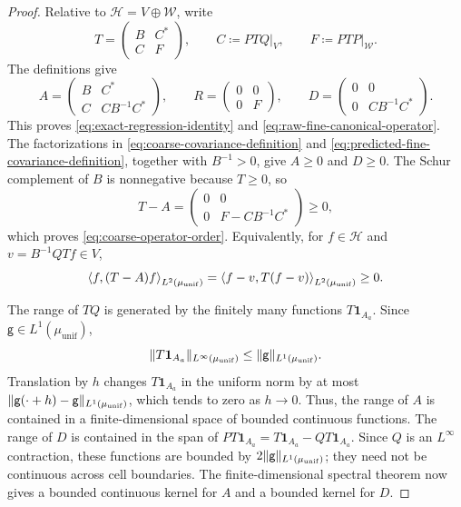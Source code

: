 \documentclass[11pt,reqno]{amsart}
\numberwithin{equation}{section}
\theoremstyle{plain}
\theoremstyle{definition}
\DeclarePairedDelimiter{\norm}{\lVert}{\rVert}
\DeclarePairedDelimiter{\ip}{\langle}{\rangle}
\newcommand{\one}{\mathbf 1}
\newcommand{\g}{\mathsf g}
\newcommand{\muunif}{\mu_{\mathrm{unif}}}
\begin{document}
\begin{proof}
Relative to $\mathcal H=V\oplus\mathcal W$, write
\begin{equation}
 T=\begin{pmatrix}B&C^*\\ C&F\end{pmatrix},
 \qquad
 C\coloneqq PTQ\big|_V,
 \qquad
 F\coloneqq PTP\big|_{\mathcal W}.
 \label{eq:block-matrix-T}
\end{equation}
The definitions give
\begin{equation}
 A=\begin{pmatrix}B&C^*\\ C&CB^{-1}C^*\end{pmatrix},
 \qquad
 R=\begin{pmatrix}0&0\\0&F\end{pmatrix},
 \qquad
 D=\begin{pmatrix}0&0\\0&CB^{-1}C^*\end{pmatrix}.
 \label{eq:block-matrices-ARD}
\end{equation}
This proves \eqref{eq:exact-regression-identity} and \eqref{eq:raw-fine-canonical-operator}. The factorizations in \eqref{eq:coarse-covariance-definition} and \eqref{eq:predicted-fine-covariance-definition}, together with $B^{-1}>0$, give $A\geq0$ and $D\geq0$. The Schur complement of $B$ is nonnegative because $T\geq0$, so
\begin{equation}
 T-A
 =\begin{pmatrix}0&0\\0&F-CB^{-1}C^*\end{pmatrix}\geq0,
 \label{eq:schur-complement-positive}
\end{equation}
which proves \eqref{eq:coarse-operator-order}.  Equivalently, for $f\in\mathcal H$ and $v=B^{-1}QTf\in V$,
\begin{equation}
 \ip*{f,(T-A)f}_{L^2(\muunif)}
 =\ip*{f-v,T(f-v)}_{L^2(\muunif)}\geq0.
 \label{eq:schur-square-completion}
\end{equation}

The range of $TQ$ is generated by the finitely many functions $T\one_{A_a}$.  Since $\g\in L^1(\muunif)$,
\begin{equation}
 \norm{T\one_{A_a}}_{L^\infty(\muunif)}
 \leq\norm{\g}_{L^1(\muunif)}.
 \label{eq:cell-potential-bounded}
\end{equation}
Translation by $h$ changes $T\one_{A_a}$ in the uniform norm by at most $\norm{\g(\cdot+h)-\g}_{L^1(\muunif)}$, which tends to zero as $h\to0$. Thus, the range of $A$ is contained in a finite-dimensional space of bounded continuous functions. The range of $D$ is contained in the span of $PT\one_{A_a}=T\one_{A_a}-QT\one_{A_a}$. Since $Q$ is an $L^\infty$ contraction, these functions are bounded by $2\norm{\g}_{L^1(\muunif)}$; they need not be continuous across cell boundaries. The finite-dimensional spectral theorem now gives a bounded continuous kernel for $A$ and a bounded kernel for $D$.
\end{proof}
\end{document}
